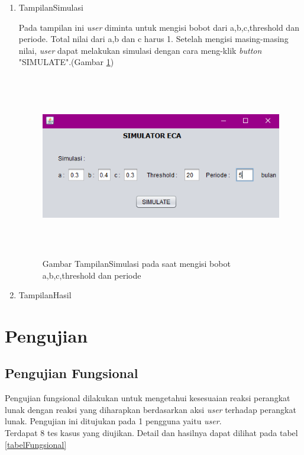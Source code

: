 \begin{enumerate}
	\item TampilanSimulasi
	
	Pada tampilan ini \textit{user} diminta untuk mengisi bobot dari a,b,c,threshold dan periode. Total nilai dari a,b dan c harus 1. Setelah mengisi masing-masing nilai, \textit{user} dapat melakukan simulasi dengan cara meng-klik \textit{button} "SIMULATE".(Gambar \ref{fig:tampilansimulasi})
	
		\begin{figure} [H]
	\centering  
	\includegraphics[width=14cm, height=8cm]{tampilanImplementasiSimulasi1} 
		\caption[Gambar TampilanSimulasi]{Gambar TampilanSimulasi pada saat mengisi bobot a,b,c,threshold dan periode}
	\label{fig:tampilansimulasi} 
\end{figure}

	\item TampilanHasil
\end{enumerate}

\section{Pengujian}
\subsection{Pengujian Fungsional}
Pengujian fungsional dilakukan untuk mengetahui kesesuaian reaksi perangkat lunak dengan reaksi yang diharapkan berdasarkan aksi \textit{user} terhadap perangkat lunak. Pengujian ini ditujukan pada 1 pengguna yaitu \textit{user}.\\
Terdapat 8 tes kasus yang diujikan. Detail dan hasilnya dapat dilihat pada tabel \ref{tabelFungsional}

